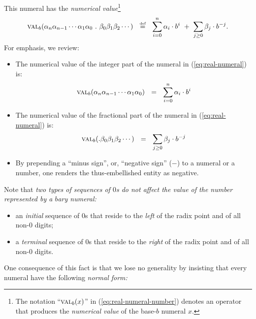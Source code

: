 \noindent
This numeral has the {\it numerical value}\footnote{The notation
  ``$\mbox{\sc val}_{b}(x)$'' in (\ref{eq:real-numeral-number})
  denotes an operator that produces the {\em numerical value} of the
  base-$b$ numeral $x$.}
\begin{equation}
\label{eq:real-numeral-number}
\mbox{\sc val}_{b}(\alpha_n \alpha_{n-1} \cdots \alpha_1 \alpha_0                  
\ . \ \beta_0 \beta_1 \beta_2 \cdots)
\ \ \stackrel{\mbox{{\tiny def}}}{=} \ \
\sum_{i=0}^n \alpha_i \cdot b^i
\ + \ \sum_{j\geq 0} \beta_j \cdot b^{-j}.
\end{equation}
\index{base-$b$ numeral!numerical value}
For emphasis, we review:
\begin{itemize}
\item
The numerical value of the integer part of the numeral in
(\ref{eq:real-numeral}) is:
\[
\mbox{\sc val}_{b}(\alpha_n \alpha_{n-1}\cdots \alpha_1 \alpha_0)
\ \ = \ \
\sum_{i=0}^n \alpha_i \cdot b^i
\]
\item
The numerical value of the fractional part of the numeral in
(\ref{eq:real-numeral}) is:
\[
\mbox{\sc val}_{b}(. \beta_0 \beta_1 \beta_2 \cdots)
\ \ = \ \
\sum_{j\geq 0} \beta_j \cdot b^{-j}
\]
\item
By prepending a ``minus sign'', or, ``negative sign'' ($-$) to a
numeral or a number, one renders the thus-embellished entity as
negative.
\end{itemize}

Note that {\em two types of sequences of $0$s do not affect the value
  of the number represented by a $b$ary numeral:}
\begin{itemize}
\item
an {\em initial} sequence of $0$s that reside to the {\em left} of the
radix point and of all non-$0$ digits;
\item
a {\em terminal} sequence of $0$s that reside to the {\em right} of
the radix point and of all non-$0$ digits.
\end{itemize}
One consequence of this fact is that we lose no generality by
insisting that every numeral have the following {\em normal form:}

\smallskip

